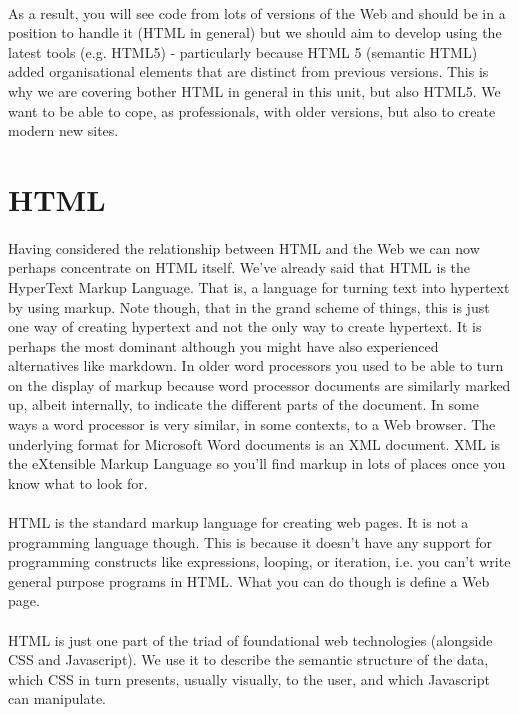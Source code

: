 \paragraph{} As a result, you will see code from lots of versions of the Web and should be in a position to handle it (HTML in general) but we should aim to develop using the latest tools (e.g. HTML5) - particularly because HTML 5 (semantic HTML) added organisational elements that are distinct from previous versions. This is why we are covering bother HTML in general in this unit, but also HTML5. We want to be able to cope, as professionals, with older versions, but also to create modern new sites.

\section{HTML}
\paragraph{} Having considered the relationship between HTML and the Web we can now perhaps concentrate on HTML itself. We've already said that HTML is the HyperText Markup Language. That is, a  language for turning text into hypertext by using markup. Note though, that in the grand scheme of things, this is just one way of creating hypertext and not the only way to create hypertext. It is perhaps the most dominant although you might have also experienced alternatives like markdown. In older word processors you used to be able to turn on the display of markup because word processor documents are similarly marked up, albeit internally, to indicate the different parts of the document. In some ways a word processor is very similar, in some contexts, to a Web browser. The underlying format for Microsoft Word documents is an XML document. XML is the eXtensible Markup Language so you'll find markup in lots of places once you know what to look for.
\paragraph{} HTML is the standard markup language for creating web pages. It is not a programming language  though. This is because it doesn't have any support for programming constructs like expressions, looping, or iteration, i.e. you can't write general purpose programs in HTML. What you can do though is define a Web page.
\paragraph{} HTML is just one part of the triad of foundational web technologies (alongside CSS and Javascript). We use it to describe the semantic structure of the data, which CSS in turn presents, usually visually, to the user, and which Javascript can manipulate. 
